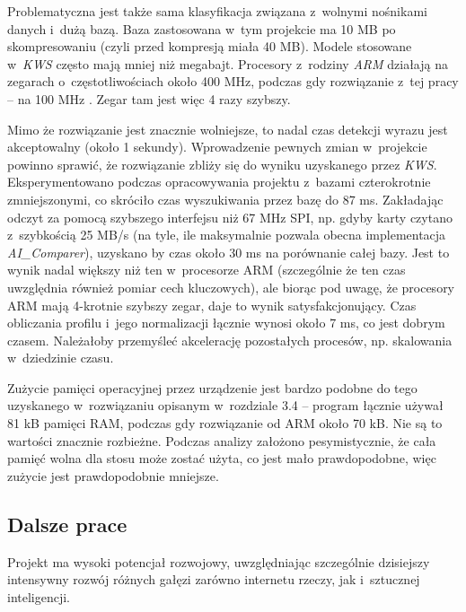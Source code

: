 Problematyczna jest także sama klasyfikacja związana z~wolnymi nośnikami danych i~dużą bazą. Baza zastosowana w~tym projekcie ma 10 MB po skompresowaniu (czyli przed kompresją miała 40 MB). Modele stosowane w~\textit{KWS} często mają mniej niż megabajt. Procesory z~rodziny \textit{ARM} działają na zegarach o~częstotliwościach około 400 MHz, podczas gdy rozwiązanie z~tej pracy – na 100 MHz \cite{tinyML}. Zegar tam jest więc 4 razy szybszy.

Mimo że rozwiązanie jest znacznie wolniejsze, to nadal czas detekcji wyrazu jest akceptowalny (około 1 sekundy). Wprowadzenie pewnych zmian w~projekcie powinno sprawić, że rozwiązanie zbliży się do wyniku uzyskanego przez \textit{KWS}. Eksperymentowano podczas opracowywania projektu z~bazami czterokrotnie zmniejszonymi, co skróciło czas wyszukiwania przez bazę do 87 ms. Zakładając odczyt za pomocą szybszego interfejsu niż 67 MHz SPI, np. gdyby karty czytano z~szybkością 25 MB/s (na tyle, ile maksymalnie pozwala obecna implementacja \textit{AI\_Comparer}), uzyskano by czas około 30 ms na porównanie całej bazy. Jest to wynik nadal większy niż ten w~procesorze ARM (szczególnie że ten czas uwzględnia również pomiar cech kluczowych), ale biorąc pod uwagę, że procesory ARM mają 4-krotnie szybszy zegar, daje to wynik satysfakcjonujący. Czas obliczania profilu i~jego normalizacji łącznie wynosi około 7 ms, co jest dobrym czasem. Należałoby przemyśleć akcelerację pozostałych procesów, np. skalowania w~dziedzinie czasu.

Zużycie pamięci operacyjnej przez urządzenie jest bardzo podobne do tego uzyskanego w~rozwiązaniu opisanym w~rozdziale 3.4 – program łącznie używał 81 kB pamięci RAM, podczas gdy rozwiązanie od ARM około 70 kB. Nie są to wartości znacznie rozbieżne. Podczas analizy założono pesymistycznie, że cała pamięć wolna dla stosu może zostać użyta, co jest mało prawdopodobne, więc zużycie jest prawdopodobnie mniejsze.

\subsection{Dalsze prace}

Projekt ma wysoki potencjał rozwojowy, uwzględniając szczególnie dzisiejszy intensywny rozwój różnych gałęzi zarówno internetu rzeczy, jak i~sztucznej inteligencji.

